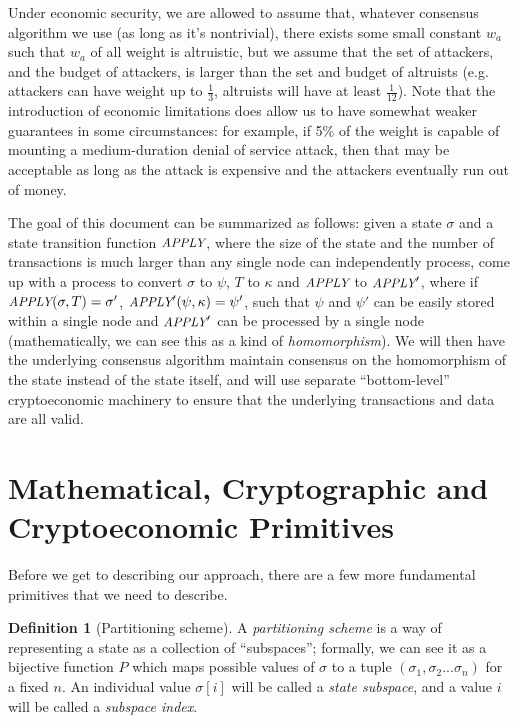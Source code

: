 \documentclass[11pt,a4paper]{article}
\makeatletter
\theoremstyle{plain}
\theoremstyle{definition}
\newtheorem{defn}{Definition}[section]
\theoremstyle{remark}
\newcommand{\eg}{e.g.\@\xspace}
\newcommand{\makeintoafunction}[1]{\textit{\uppercase{\small #1}}}
\newcommand{\APPLY}{\makeintoafunction{apply}}
\makeatother
\begin{document}
Under economic security, we are allowed to assume that, whatever consensus algorithm we use (as long as it's nontrivial), there exists some small constant $w_a$ such that $w_a$ of all weight is altruistic, but we assume that the set of attackers, and the budget of attackers, is larger than the set and budget of altruists (\eg attackers can have weight up to $\frac{1}{3}$, altruists will have at least $\frac{1}{12}$). Note that the introduction of economic limitations does allow us to have somewhat weaker guarantees in some circumstances: for example, if 5\% of the weight is capable of mounting a medium-duration denial of service attack, then that may be acceptable as long as the attack is expensive and the attackers eventually run out of money.

The goal of this document can be summarized as follows: given a state $\sigma$ and a state transition function $\APPLY$, where the size of the state and the number of transactions is much larger than any single node can independently process, come up with a process to convert $\sigma$ to $\psi$, $T$ to $\kappa$ and $\APPLY$ to $\APPLY'$, where if $\APPLY(\sigma, T) = \sigma'$, $\APPLY'(\psi, \kappa) = \psi'$, such that $\psi$ and $\psi'$ can be easily stored within a single node and $\APPLY'$ can be processed by a single node (mathematically, we can see this as a kind of \emph{homomorphism}). We will then have the underlying consensus algorithm maintain consensus on the homomorphism of the state instead of the state itself, and will use separate ``bottom-level'' cryptoeconomic machinery to ensure that the underlying transactions and data are all valid.

\section{Mathematical, Cryptographic and Cryptoeconomic Primitives}

Before we get to describing our approach, there are a few more fundamental primitives that we need to describe.

\begin{defn}[Partitioning scheme]
A \emph{partitioning scheme} is a way of representing a state as a collection of ``subspaces''; formally, we can see it as a bijective function $P$ which maps possible values of $\sigma$ to a tuple $(\sigma_1, \sigma_2 ... \sigma_n)$ for a fixed $n$. An individual value $\sigma[i]$ will be called a \emph{state subspace}, and a value $i$ will be called a \emph{subspace index}.
\end{defn}
\end{document}
